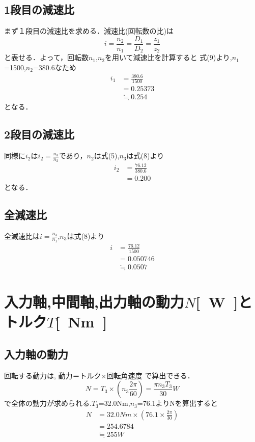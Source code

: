\documentclass[a4paper,titlepage]{ltjsarticle}
\begin{document}
\subsection{1段目の減速比}
まず１段目の減速比を求める．減速比(回転数の比)は
\begin{equation}
	i=\frac{n_2}{n_1}=\frac{D_1}{D_2}=\frac{z_1}{z_2}
\end{equation}
と表せる．よって，回転数$n_1$,$n_2$を用いて減速比を計算すると
式(9)より,$n_1$=1500,$n_2$=380.6なため
\begin{align}
	i_1&=\frac{380.6}{1500}\\
	   &=0.25373\\
		 &\fallingdotseq0.254
\end{align}
となる．

\subsection{2段目の減速比}
同様に$i_2$は$i_2=\frac{n_3}{n_2}$であり，$n_2$は式(5),$n_3$は式(8)より
\begin{align}
	i_2&=\frac{76.12}{380.6}\\
	   &=0.200
\end{align}
となる．

\subsection{全減速比}
全減速比は$i=\frac{n_3}{n_1}$,$n_3$は式(8)より
\begin{align}
	i&=\frac{76.12}{1500}\\
	 &=0.050746\\
	 &\fallingdotseq0.0507
\end{align}

\section{入力軸,中間軸,出力軸の動力$N${\si{[W]}}とトルク$T${\si{[Nm]}}}

\subsection{入力軸の動力}
回転する動力は,
{動力＝トルク$\times$回転角速度}
で算出できる．
\begin{equation}
\label{}
N=T_3\times(n_3\frac{2\pi}{60})=\frac{\pi n_3T_3}{30} \si{W}
\end{equation}
で全体の動力が求められる.$T_3$=32.0{Nm},$n_3$=76.1よりNを算出すると
\begin{align}
\label{a}
N &=32.0{\si{Nm}}\times (76.1\times \frac{2\pi}{30})\\
  &=254.6784\\
	&\fallingdotseq 255{\si{W}}\\
\end{align}
\end{document}
